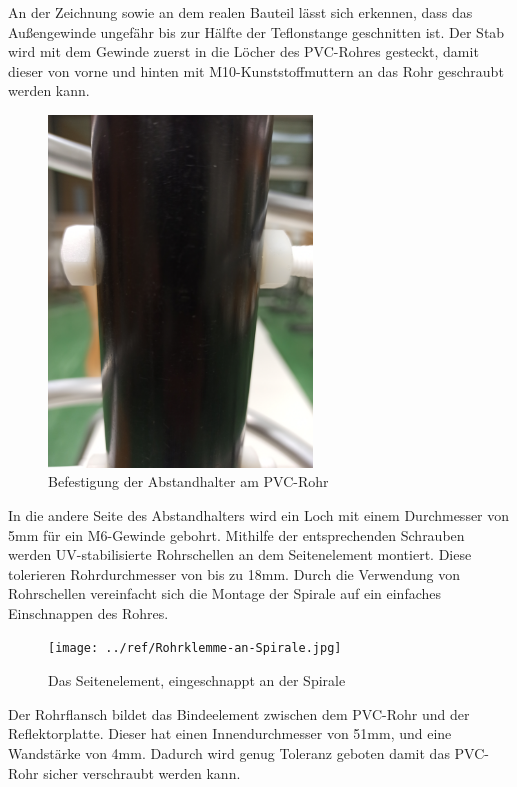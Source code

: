 An der Zeichnung sowie an dem realen Bauteil lässt sich erkennen, dass das Außengewinde ungefähr bis zur Hälfte der Teflonstange geschnitten ist. Der Stab wird mit dem Gewinde zuerst in die Löcher des PVC-Rohres gesteckt, damit dieser von vorne und hinten mit M10-Kunststoffmuttern an das Rohr geschraubt werden kann.

\begin{figure}[h!]
	\centering
	\includegraphics[width=7cm, angle=270]{../ref/Befestigung-Querelement.jpg}
	\caption{Befestigung der Abstandhalter am PVC-Rohr}
	\label{fig:Abstandhalter-Befestigung}
\end{figure}

In die andere Seite des Abstandhalters wird ein Loch mit einem Durchmesser von 5mm für ein M6-Gewinde gebohrt. Mithilfe der entsprechenden Schrauben werden UV-stabilisierte Rohrschellen an dem Seitenelement montiert. Diese tolerieren Rohrdurchmesser von bis zu 18mm. Durch die Verwendung von Rohrschellen vereinfacht sich die Montage der Spirale auf ein einfaches Einschnappen des Rohres.


\begin{figure}[h!]
	\centering
	\texttt{[image: ../ref/Rohrklemme-an-Spirale.jpg]}
	\caption{Das Seitenelement, eingeschnappt an der Spirale}
	\label{fig:Seitenelement-an-Spirale}
\end{figure}

Der Rohrflansch bildet das Bindeelement zwischen dem PVC-Rohr und der Reflektorplatte. Dieser hat einen Innendurchmesser von 51mm, und eine Wandstärke von 4mm. Dadurch wird genug Toleranz geboten damit das PVC-Rohr sicher verschraubt werden kann. 

